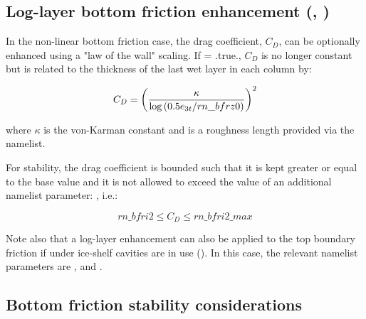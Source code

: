 \documentclass[../tex_main/NEMO_manual]{subfiles}
\begin{document}
\subsection[Log-layer btm frict enhncmnt (\protect\np{nn\_botfr}\forcode{ = 2}, \protect\np{ln\_loglayer}\forcode{ = .true.})]
				{Log-layer bottom friction enhancement (\protect{}, \protect{})}
\label{subsec:ZDF_bfr_loglayer}

In the non-linear bottom friction case, the drag coefficient, $C_D$, can be optionally
enhanced using a "law of the wall" scaling. If   = .true., $C_D$ is no
longer constant but is related to the thickness of the last wet layer in each column by:

\begin{equation}
C_D = \left ( {\kappa \over {\rm log}\left ( 0.5e_{3t}/rn\_bfrz0 \right ) } \right )^2
\end{equation}

\noindent where $\kappa$ is the von-Karman constant and  is a roughness
length provided via the namelist.

For stability, the drag coefficient is bounded such that it is kept greater or equal to
the base  value and it is not allowed to exceed the value of an additional
namelist parameter: , i.e.:

\begin{equation}
rn\_bfri2 \leq C_D \leq rn\_bfri2\_max
\end{equation}

\noindent Note also that a log-layer enhancement can also be applied to the top boundary
friction if under ice-shelf cavities are in use ().  In this case, the
relevant namelist parameters are , 
and .

\subsection{Bottom friction stability considerations}
\label{subsec:ZDF_bfr_stability}
\end{document}
